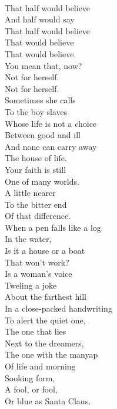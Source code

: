 \documentclass[smalldemyvopaper,11pt,twoside,onecolumn,openright,extrafontsizes]{memoir}
\begin{document}
\\That half would believe
\\And half would say
\\That half would believe
\\That would believe
\\That would believe.
\\You mean that, now?
\\Not for herself.
\\Not for herself.
\\Sometimes she calls
\\To the boy slaves
\\Whose life is not a choice
\\Between good and ill
\\And none can carry away
\\The house of life.
\\Your faith is still
\\One of many worlds.
\\A little nearer
\\To the bitter end
\\Of that difference.
\\When a pen falls like a log
\\In the water,
\\Is it a house or a boat
\\That won't work?
\\Is a woman's voice
\\Tweling a joke
\\About the farthest hill
\\In a close-packed handwriting
\\To alert the quiet one,
\\The one that lies
\\Next to the dreamers,
\\The one with the manyap
\\Of life and morning
\\Sooking form,
\\A fool, or fool,
\\Or blue as Santa Claus.
\end{document}
